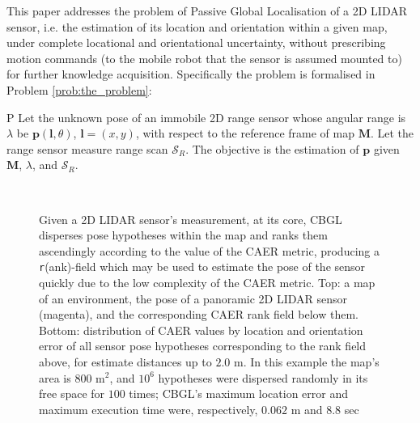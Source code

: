 This paper addresses the problem of Passive Global Localisation of a 2D LIDAR
sensor, i.e. the estimation of its location and orientation within a given map,
under complete locational and orientational uncertainty, without prescribing
motion commands (to the mobile robot that the sensor is assumed mounted to) for
further knowledge acquisition. Specifically the problem is formalised in
Problem \ref{prob:the_problem}:

\begin{customprb}{P}
  \label{prob:the_problem}
  Let the unknown pose of an immobile 2D range sensor whose angular range is
  $\lambda$ be $\bm{p}(\bm{l},\theta)$, $\bm{l} = (x,y)$, with respect to the
  reference frame of map $\bm{M}$. Let the range sensor measure range scan
  $\mathcal{S}_R$. The objective is the estimation of $\bm{p}$ given $\bm{M}$,
  $\lambda$, and $\mathcal{S}_R$.
\end{customprb}

\begin{figure}\vspace{0.4em}
  \subfloat{    \label{fig:a}} \vspace{-1.7cm}\\
  \subfloat{\hspace{-0.3cm} \label{fig:b}}
  \caption{\small
           Given a 2D LIDAR sensor's measurement, at its core, CBGL disperses
           pose hypotheses within the map and ranks them ascendingly according
           to the value of the CAER metric, producing a \texttt{r}(ank)-field
           which may be used to estimate the pose of the sensor quickly due to
           the low complexity of the CAER metric.
           Top: a map of an environment, the pose of a panoramic 2D LIDAR sensor
           (magenta), and the corresponding CAER rank field below them.
           Bottom: distribution of CAER values by location and orientation
           error of all sensor pose hypotheses corresponding to the rank field
           above, for estimate distances up to $2.0$ m.
           In this example the map's area is $800$ m$^2$, and $10^6$ hypotheses
           were dispersed randomly in its free space for $100$ times; CBGL's
           maximum location error and maximum execution time were,
           respectively, $0.062$ m and $8.8$ sec
           }
  \vspace{-0.75cm}
  \label{fig:face}
\end{figure}
